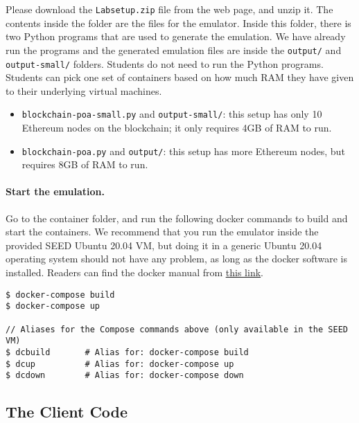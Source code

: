 Please download the \texttt{Labsetup.zip} file from the web page, and
unzip it. The contents inside the  folder are the 
files for the emulator. Inside this folder, there is two Python programs 
that are used to generate the emulation. 
We have already run the programs and the generated 
emulation files are inside the \texttt{output/} and \texttt{output-small/} 
folders. Students do not need to run the Python programs.  Students can pick
one set of containers based on how much RAM they have given to their 
underlying virtual machines. 

\begin{itemize}[noitemsep]
\item \texttt{blockchain-poa-small.py} and \texttt{output-small/}: this setup
has only 10 Ethereum nodes on the blockchain; it only requires 4GB of RAM to run.

\item \texttt{blockchain-poa.py} and \texttt{output/}: this setup has more Ethereum
nodes, but requires 8GB of RAM to run.
\end{itemize}
 


\paragraph{Start the emulation.}
Go to the container folder, and run the following docker commands
to build and start the containers. We recommend that you run the emulator inside
the provided SEED Ubuntu 20.04 VM, but doing it in a generic Ubuntu 20.04 operating system
should not have any problem, as long as the docker software is installed.
Readers can find the docker manual from
\href{https://github.com/seed-labs/seed-labs/blob/master/manuals/docker/SEEDManual-Container.md}
{\underline{this link}}.

\begin{lstlisting}
$ docker-compose build
$ docker-compose up

// Aliases for the Compose commands above (only available in the SEED VM)
$ dcbuild       # Alias for: docker-compose build
$ dcup          # Alias for: docker-compose up
$ dcdown        # Alias for: docker-compose down
\end{lstlisting}




\subsection{The Client Code} 

